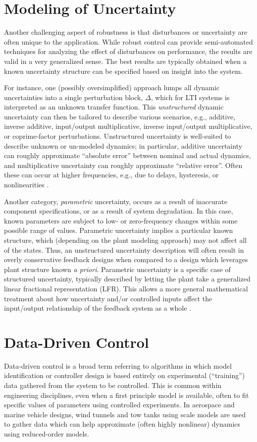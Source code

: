 \section{Modeling of Uncertainty}
\label{chap:introModelingUncertainty}
Another challenging aspect of robustness is that disturbances or uncertainty are often unique to the application.  While robust control can provide semi-automated techniques for analyzing the effect of disturbances on performance, the results are valid in a very generalized sense.  The best results are typically obtained when a known uncertainty structure can be specified based on insight into the system.

For instance, one (possibly oversimplified) approach lumps all dynamic uncertainties into a single perturbation block, $\Delta$, which for LTI systems is interpreted as an unknown transfer function.  This \emph{unstructured} dynamic uncertainty can then be tailored to describe various scenarios, e.g., additive, inverse additive, input/output multiplicative, inverse input/output multiplicative, or coprime-factor perturbations.  Unstructured uncertainty is well-suited to describe unknown or un-modeled dynamics; in particular, additive uncertainty can roughly approximate ``absolute error'' between nominal and actual dynamics, and multiplicative uncertainty can roughly approximate ``relative error''.  Often these can occur at higher frequencies, e.g., due to delays, hysteresis, or nonlinearities \cite{gu2005robust}.

Another category, \emph{parametric} uncertainty, occurs as a result of inaccurate component specifications, or as a result of system degradation.  In this case, known parameters are subject to low- or zero-frequency changes within some possible range of values.  Parametric uncertainty implies a particular known structure, which (depending on the plant modeling approach) may not affect all of the states.  Thus, an unstructured uncertainty description will often result in overly conservative feedback designs when compared to a design which leverages plant structure known \emph{a priori}.  Parametric uncertainty is a specific case of structured uncertainty, typically described by letting the plant take a generalized linear fractional representation (LFR).  This allows a more general mathematical treatment about how uncertainty and/or controlled inputs affect the input/output relationship of the feedback system as a whole \cite{gu2005robust}.

\section{Data-Driven Control}
\label{chap:introDataDrivenControl}
Data-driven control is a broad term referring to algorithms in which model identification or controller design is based entirely on experimental (``training'') data gathered from the system to be controlled.  This is common within engineering disciplines, even when a first principle model is available, often to fit specific values of parameters using controlled experiments.  In aerospace and marine vehicle designs, wind tunnels and tow tanks using scale models are used to gather data which can help approximate (often highly nonlinear) dynamics using reduced-order models.

